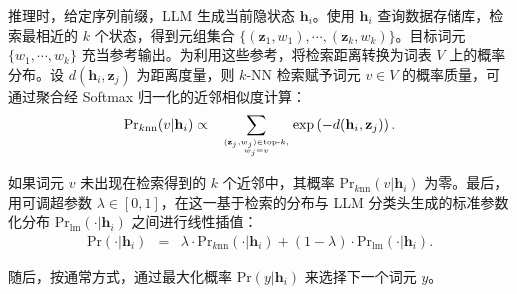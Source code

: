 推理时，给定序列前缀，LLM 生成当前隐状态 $\mathbf{h}_i$。使用 $\mathbf{h}_i$ 查询数据存储库，检索最相近的 $k$ 个状态，得到元组集合 $\{(\mathbf{z}_1,w_1),\cdots,(\mathbf{z}_k,w_k)\}$。目标词元 $\{w_1,\cdots,w_k\}$ 充当参考输出。为利用这些参考，将检索距离转换为词表 $V$ 上的概率分布。设 $d(\mathbf{h}_i, \mathbf{z}_j)$ 为距离度量，则 $k$-NN 检索赋予词元 $v \in V$ 的概率质量，可通过聚合经 Softmax 归一化的近邻相似度计算：
\begin{eqnarray}
\mathrm{Pr}_{k\mathrm{nn}}(v|\mathbf{h}_i) & \propto & \sum_{(\mathbf{z}_j, w_j) \in \text{top-}k, \atop w_j = v} \exp\left(-d(\mathbf{h}_i, \mathbf{z}_j)\right). \label{eq:knn-lm-dist}
\end{eqnarray}

\noindent 如果词元 $v$ 未出现在检索得到的 $k$ 个近邻中，其概率 $\mathrm{Pr}_{k\mathrm{nn}}(v|\mathbf{h}_i)$ 为零。最后，用可调超参数 $\lambda \in [0,1]$，在这一基于检索的分布与 LLM 分类头生成的标准参数化分布 $\mathrm{Pr}_{\mathrm{lm}}(\cdot|\mathbf{h}_i)$ 之间进行线性插值：
\begin{eqnarray}
\mathrm{Pr}(\cdot|\mathbf{h}_i) & = & \lambda \cdot \mathrm{Pr}_{k\mathrm{nn}}(\cdot|\mathbf{h}_i) + (1 - \lambda) \cdot \mathrm{Pr}_{\mathrm{lm}}(\cdot|\mathbf{h}_i).
\end{eqnarray}

\noindent 随后，按通常方式，通过最大化概率 $\mathrm{Pr}(y|\mathbf{h}_i)$ 来选择下一个词元 $y$。

